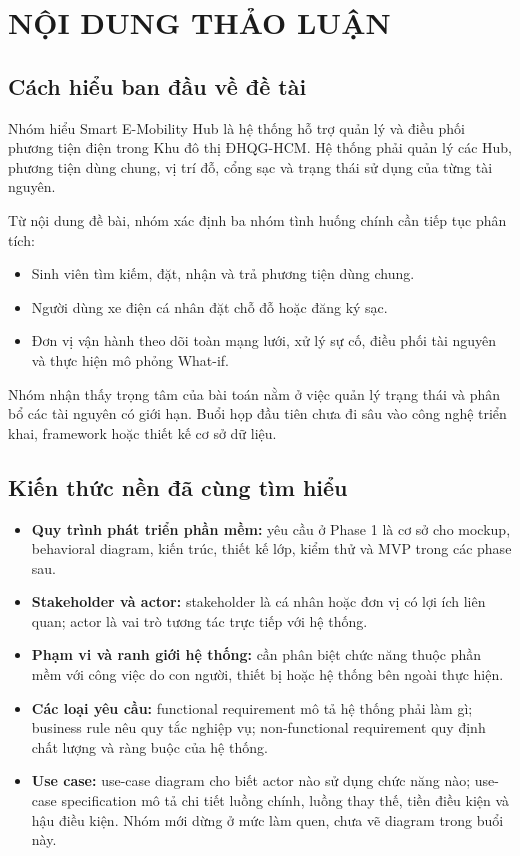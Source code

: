 \documentclass[10pt,a4paper]{article}
\begin{document}
\section{NỘI DUNG THẢO LUẬN}

\subsection{Cách hiểu ban đầu về đề tài}

Nhóm hiểu Smart E-Mobility Hub là hệ thống hỗ trợ quản lý và điều phối phương tiện điện trong Khu đô thị ĐHQG-HCM. Hệ thống phải quản lý các Hub, phương tiện dùng chung, vị trí đỗ, cổng sạc và trạng thái sử dụng của từng tài nguyên.

Từ nội dung đề bài, nhóm xác định ba nhóm tình huống chính cần tiếp tục phân tích:

\begin{itemize}
  \item Sinh viên tìm kiếm, đặt, nhận và trả phương tiện dùng chung.
  \item Người dùng xe điện cá nhân đặt chỗ đỗ hoặc đăng ký sạc.
  \item Đơn vị vận hành theo dõi toàn mạng lưới, xử lý sự cố, điều phối tài nguyên và thực hiện mô phỏng What-if.
\end{itemize}

Nhóm nhận thấy trọng tâm của bài toán nằm ở việc quản lý trạng thái và phân bổ các tài nguyên có giới hạn. Buổi họp đầu tiên chưa đi sâu vào công nghệ triển khai, framework hoặc thiết kế cơ sở dữ liệu.

\subsection{Kiến thức nền đã cùng tìm hiểu}

\begin{itemize}
  \item \textbf{Quy trình phát triển phần mềm:} yêu cầu ở Phase 1 là cơ sở cho mockup, behavioral diagram, kiến trúc, thiết kế lớp, kiểm thử và MVP trong các phase sau.
  \item \textbf{Stakeholder và actor:} stakeholder là cá nhân hoặc đơn vị có lợi ích liên quan; actor là vai trò tương tác trực tiếp với hệ thống.
  \item \textbf{Phạm vi và ranh giới hệ thống:} cần phân biệt chức năng thuộc phần mềm với công việc do con người, thiết bị hoặc hệ thống bên ngoài thực hiện.
  \item \textbf{Các loại yêu cầu:} functional requirement mô tả hệ thống phải làm gì; business rule nêu quy tắc nghiệp vụ; non-functional requirement quy định chất lượng và ràng buộc của hệ thống.
  \item \textbf{Use case:} use-case diagram cho biết actor nào sử dụng chức năng nào; use-case specification mô tả chi tiết luồng chính, luồng thay thế, tiền điều kiện và hậu điều kiện. Nhóm mới dừng ở mức làm quen, chưa vẽ diagram trong buổi này.
\end{itemize}
\end{document}
